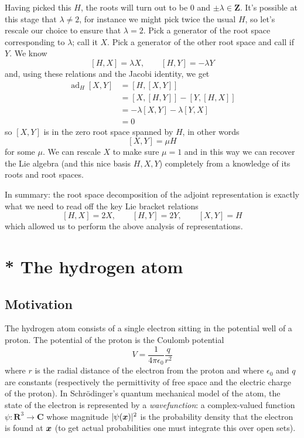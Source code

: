 \documentclass[12pt]{article}
\renewcommand\vec[1]{\ensuremath\boldsymbol{#1}}
\newcommand{\CC}{\mathbf{C}}
\newcommand{\RR}{\mathbf{R}}
\newcommand{\ZZ}{\mathbf{Z}}
\newcommand{\OP}{\operatorname}
\newcommand{\ad}{\OP{ad}}
\theoremstyle{definition}
\theoremstyle{check}
\theoremstyle{remark}
\theoremstyle{TheoremNum}
\begin{document}
Having picked this $H$, the roots will turn out to be $0$ and $\pm\lambda\in\ZZ$. It's possible at this stage that $\lambda\neq 2$, for instance we might pick twice the usual $H$, so let's rescale our choice to ensure that $\lambda=2$. Pick a generator of the root space corresponding to $\lambda$; call it $X$. Pick a generator of the other root space and call if $Y$. We know
\[[H,X]=\lambda X,\qquad [H,Y]=-\lambda Y\]
and, using these relations and the Jacobi identity, we get
\begin{align*}
\ad_H[X,Y]&=[H,[X,Y]]\\
&=[X,[H,Y]]-[Y,[H,X]]\\
&=-\lambda[X,Y]-\lambda[Y,X]\\
&=0
\end{align*}
so $[X,Y]$ is in the zero root space spanned by $H$, in other words
\[[X,Y]=\mu H\]
for some $\mu$. We can rescale $X$ to make sure $\mu=1$ and in this way we can recover the Lie algebra (and this nice basis $H,X,Y$) completely from a knowledge of its roots and root spaces.

In summary: the root space decomposition of the adjoint representation is exactly what we need to read off the key Lie bracket relations
\[[H,X]=2X,\qquad [H,Y]=2Y,\qquad[X,Y]=H\]
which allowed us to perform the above analysis of representations.



\section{* The hydrogen atom}

\subsection{Motivation}

The hydrogen atom consists of a single electron sitting in the potential well of a proton. The potential of the proton is the Coulomb potential
\[V=\frac{1}{4\pi\epsilon_0}\frac{q}{r^2}\]
where $r$ is the radial distance of the electron from the proton and where $\epsilon_0$ and $q$ are constants (respectively the permittivity of free space and the electric charge of the proton). In Schr\"{o}dinger's quantum mechanical model of the atom, the state of the electron is represented by a {\em wavefunction}: a complex-valued function $\psi\colon\RR^3\to\CC$ whose magnitude $|\psi(\vec{x})|^2$ is the probability density that the electron is found at $\vec{x}$ (to get actual probabilities one must integrate this over open sets).
\end{document}
